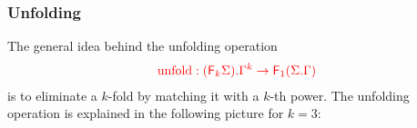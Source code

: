 \subsubsection{Unfolding}
The general idea behind the  unfolding operation 
\begin{align*}
{\color{red}{
    {\color{red}{\mathrm{unfold}}}: {\color{red}{({\color{red}{\mathsf F_{k}}}\Sigma) . \Gamma^k}} \to {\color{red}{\mathsf F_{1}}}({\color{red}{\Sigma . \Gamma}})
}}
\end{align*} 
is to eliminate a $k$-fold by matching it with a $k$-th power. 
The unfolding operation is explained in the following picture for $k=3$: 

